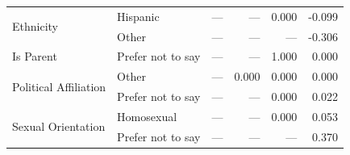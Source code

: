 \begin{longtable}{llrrrr}
\cline{1-6}
\multirow[t]{2}{*}{Ethnicity} & Hispanic & --- & --- & 0.000 & -0.099 \\
 & Other & --- & --- & --- & -0.306 \\
\cline{1-6}
Is Parent & Prefer not to say & --- & --- & 1.000 & 0.000 \\
\cline{1-6}
\multirow[t]{2}{*}{Political Affiliation} & Other & --- & 0.000 & 0.000 & 0.000 \\
 & Prefer not to say & --- & --- & 0.000 & 0.022 \\
\cline{1-6}
\multirow[t]{2}{*}{Sexual Orientation} & Homosexual & --- & --- & 0.000 & 0.053 \\
 & Prefer not to say & --- & --- & --- & 0.370 \\
\cline{1-6}
\end{longtable}
